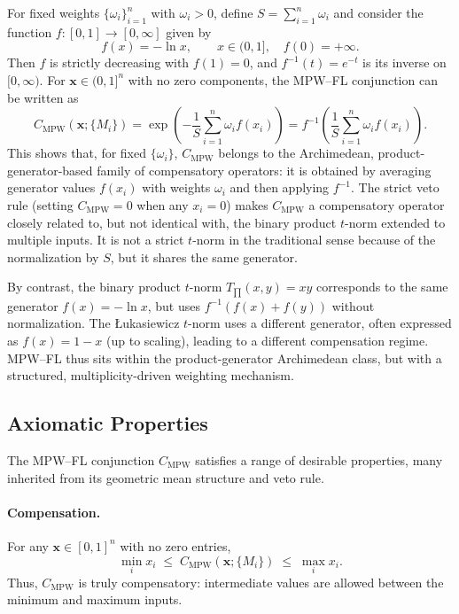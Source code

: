\documentclass[11pt]{article}
\begin{document}
For fixed weights $\{\omega_i\}_{i=1}^n$ with $\omega_i > 0$, define $S = \sum_{i=1}^n \omega_i$ and consider the function $f:[0,1]\to[0,\infty]$ given by
\[
  f(x) = -\ln x, \qquad x \in (0,1], \quad f(0) = +\infty.
\]
Then $f$ is strictly decreasing with $f(1)=0$, and $f^{-1}(t) = e^{-t}$ is its inverse on $[0,\infty)$. For $\mathbf{x} \in (0,1]^n$ with no zero components, the MPW--FL conjunction can be written as
\begin{equation}
  C_{\mathrm{MPW}}(\mathbf{x};\{M_i\})
  = \exp\!\left(-\frac{1}{S}\sum_{i=1}^n \omega_i f(x_i)\right)
  = f^{-1}\!\left(\frac{1}{S}\sum_{i=1}^n \omega_i f(x_i)\right).
  \label{eq:archimedean-form}
\end{equation}
This shows that, for fixed $\{\omega_i\}$, $C_{\mathrm{MPW}}$ belongs to the Archimedean, product-generator-based family of compensatory operators: it is obtained by averaging generator values $f(x_i)$ with weights $\omega_i$ and then applying $f^{-1}$. The strict veto rule (setting $C_{\mathrm{MPW}} = 0$ when any $x_i = 0$) makes $C_{\mathrm{MPW}}$ a compensatory operator closely related to, but not identical with, the binary product $t$-norm extended to multiple inputs. It is not a strict $t$-norm in the traditional sense because of the normalization by $S$, but it shares the same generator.

By contrast, the binary product $t$-norm $T_{\prod}(x,y) = xy$ corresponds to the same generator $f(x)=-\ln x$, but uses $f^{-1}(f(x)+f(y))$ without normalization. The \L{}ukasiewicz $t$-norm uses a different generator, often expressed as $f(x) = 1-x$ (up to scaling), leading to a different compensation regime. MPW--FL thus sits within the product-generator Archimedean class, but with a structured, multiplicity-driven weighting mechanism.

\subsection{Axiomatic Properties}
\label{subsec:axioms}

The MPW--FL conjunction $C_{\mathrm{MPW}}$ satisfies a range of desirable properties, many inherited from its geometric mean structure and veto rule.

\paragraph{Compensation.}
For any $\mathbf{x} \in [0,1]^n$ with no zero entries,
\[
  \min_i x_i \;\le\; C_{\mathrm{MPW}}(\mathbf{x};\{M_i\}) \;\le\; \max_i x_i.
\]
Thus, $C_{\mathrm{MPW}}$ is truly compensatory: intermediate values are allowed between the minimum and maximum inputs.
\end{document}
